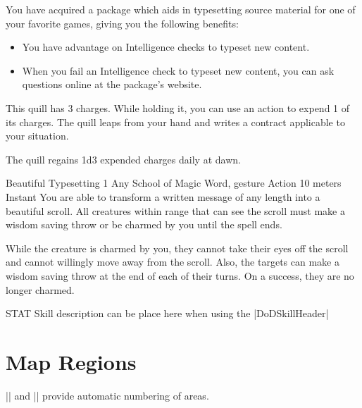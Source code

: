 \documentclass[letterpaper,openany,nodeprecatedcode]{dndbook}
\begin{document}
\begin{multicols}{2}
  You have acquired a package which aids in typesetting source material for one of your favorite games, giving you the following benefits:

  \begin{itemize}
    \item You have advantage on Intelligence checks to typeset new content.
    \item When you fail an Intelligence check to typeset new content, you can ask questions online at the package's website.
  \end{itemize}

  This quill has 3 charges. While holding it, you can use an action to expend 1 of its charges. The quill leaps from your hand and writes a contract applicable to your situation.

  The quill regains 1d3 expended charges daily at dawn.

  \DoDSpellHeader%
      {Beautiful Typesetting}
      {1}
      {Any School of Magic}
      {Word, gesture}
      {Action}
      {10 meters}
      {Instant}
  You are able to transform a written message of any length into a beautiful scroll. All creatures within range that can see the scroll must make a wisdom saving throw or be charmed by you until the spell ends.

  While the creature is charmed by you, they cannot take their eyes off the scroll and cannot willingly move away from the scroll. Also, the targets can make a wisdom saving throw at the end of each of their turns. On a success, they are no longer charmed.

   {STAT}
Skill description can be place here when using the |DoDSkillHeader|

\end{multicols}

\chapter{Map Regions}
\begin{multicols}{2}
   |\DndArea| and |\DndSubArea| provide automatic numbering of areas. \lipsum[4]
\end{multicols}
\end{document}
